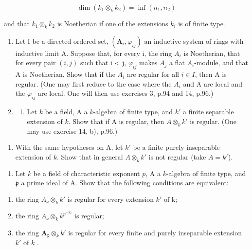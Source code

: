 \[
\dim (k _ {1} \otimes_ {k} k _ {2}) = \inf (n _ {1}, n _ {2})
\]

and that \(k_{1} \otimes_{k} k_{2}\) is Noetherian if one of the extensions \(k_{i}\) is of finite type.

\begin{enumerate}
\def\labelenumi{\arabic{enumi})}
\setcounter{enumi}{20}
\item
  Let I be a directed ordered set, \((\mathbf{A}_{i}, \varphi_{ij})\) an inductive system of rings with inductive limit A. Suppose that, for every i, the ring \(A_{i}\) is Noetherian, that for every pair \((i, j)\) such that i \textless{} j, \(\varphi_{ij}\) makes \(A_{j}\) a flat \(A_{i}\)-module, and that A is Noetherian. Show that if the \(A_{i}\) are regular for all \(i \in I\), then A is regular. (One may first reduce to the case where the \(A_{i}\) and A are local and the \(\varphi_{ij}\) are local. One will then use exercises 3, p.94 and 14, p.96.)
\item
  \begin{enumerate}
  \def\labelenumii{\alph{enumii})}
  \tightlist
  \item
    Let \(k\) be a field, A a \(k\)-algebra of finite type, and \(k'\) a finite separable extension of \(k\). Show that if A is regular, then \(A \otimes_k k'\) is regular. (One may use exercise 14, b), p.96.)
  \end{enumerate}
\end{enumerate}

\begin{enumerate}
\def\labelenumi{\alph{enumi})}
\setcounter{enumi}{1}
\tightlist
\item
  With the same hypotheses on A, let \(k'\) be a finite purely inseparable extension of \(k\). Show that in general \(A \otimes_k k'\) is not regular (take \(A = k'\)).
\end{enumerate}

\begin{enumerate}
\def\labelenumi{\arabic{enumi})}
\setcounter{enumi}{22}
\tightlist
\item
  Let \(k\) be a field of characteristic exponent \(p\), A a \(k\)-algebra of finite type, and \(\mathfrak{p}\) a prime ideal of A. Show that the following conditions are equivalent:
\end{enumerate}

\begin{enumerate}
\def\labelenumi{(\roman{enumi})}
\item
  the ring \(A_{\mathfrak{p}} \otimes_{k} k'\) is regular for every extension \(k'\) of k;
\item
  the ring \(A_{\mathfrak{p}} \otimes_{k} k^{p^{-\infty}}\) is regular;
\item
  the ring \(\mathbf{A}_{\mathfrak{p}} \otimes_{k} k'\) is regular for every finite and purely inseparable extension \(k'\) of \(k\) .
\end{enumerate}

